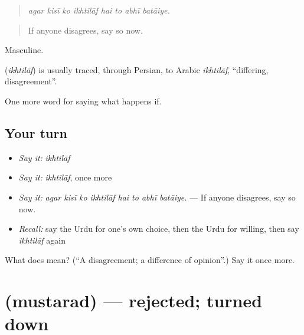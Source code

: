\begin{quote}
       
\end{quote}

\begin{quote}
\emph{agar kisī ko ikhtilāf hai to abhī batāiye.}
\end{quote}

\begin{quote}
If anyone disagrees, say so now.
\end{quote}

Masculine.

\begin{cousinweb}
\textbf{} (\emph{ikhtilāf}) is usually traced, through Persian, to Arabic \emph{ikhtilāf}, \textquotedblleft{}differing, disagreement\textquotedblright{}.
\end{cousinweb}

\begin{grammarlens}[title={What you've built}]
One more word for saying what happens if.
\end{grammarlens}

\subsection*{Your turn}
\begin{itemize}
\raggedright
  \item \emph{Say it:} \emph{ikhtilāf}
  \item \emph{Say it:} \emph{ikhtilāf}, once more
  \item \emph{Say it:} \emph{agar kisī ko ikhtilāf hai to abhī batāiye.} — If anyone disagrees, say so now.
  \item \emph{Recall:} say the Urdu for one's own choice, then the Urdu for willing, then say \emph{ikhtilāf} again
\end{itemize}

\begin{tcolorbox}[breakable,colback=teal!4,colframe=teal!35!black,title={Before you move on}]
What does  mean? (\textquotedblleft{}A disagreement; a difference of opinion\textquotedblright{}.) Say it once more.
\end{tcolorbox}
\section[\texorpdfstring{\ur{مسترد} (mustarad)}{مسترد (mustarad)}]{ (mustarad) — rejected; turned down}

